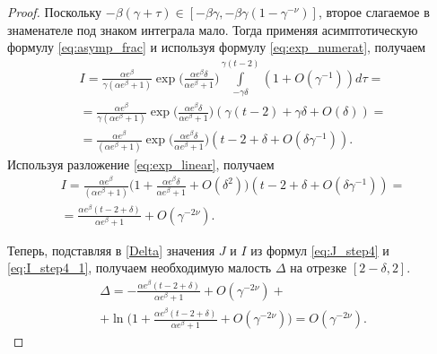 \begin{proof}
Поскольку $-\beta(\gamma + \tau) \in [-\beta\gamma, -\beta\gamma(1-\gamma^{-\nu})]$, второе слагаемое в знаменателе под знаком интеграла мало. Тогда применяя асимптотическую формулу \eqref{eq:asymp_frac} и используя формулу \eqref{eq:exp_numerat}, получаем
\begin{multline*}
	I=\frac{\alpha e^\beta}{\gamma(\alpha e^{\beta}+1)}\exp\Big(\frac{\alpha e^{\beta}\delta}{\alpha e^\beta+1}\Big)
	\int\limits_{-\gamma\delta}^{\gamma(t-2)}(1+O(\gamma^{-1}))d\tau
	=\\
	=\frac{\alpha e^\beta}{\gamma(\alpha e^{\beta}+1)}\exp\Big(\frac{\alpha e^{\beta}\delta}{\alpha e^\beta+1}\Big)(\gamma(t - 2) + \gamma\delta + O(\delta))
	=\\
	=\frac{\alpha e^\beta}{(\alpha e^{\beta}+1)}\exp\Big(\frac{\alpha e^{\beta}\delta}{\alpha e^\beta+1}\Big)(t-2+\delta+O(\delta\gamma^{-1})).
\end{multline*}
Используя разложение \eqref{eq:exp_linear}, получаем
\begin{multline}
	\label{eq:I_step4_1}
	I = \frac{\alpha e^\beta}{(\alpha e^{\beta} + 1)}\Big(1 + \frac{\alpha e^{\beta}\delta}{\alpha e^\beta+1} + O(\delta^2)\Big)(t-2+\delta+O(\delta\gamma^{-1})) = \\
	= \frac{\alpha e^\beta(t-2+\delta)}{\alpha e^\beta+1}+O(\gamma^{-2\nu}).
\end{multline}

Теперь, подставляя в \eqref{Delta} значения $J$ и $I$ из формул \eqref{eq:J_step4} и \eqref{eq:I_step4_1}, получаем необходимую малость $\Delta$ на отрезке $[2 - \delta, 2]$.
%
\begin{multline}
	\label{Delta_step4}
	\Delta=-\frac{\alpha e^\beta(t-2+\delta)}{\alpha e^\beta+1}+O(\gamma^{-2\nu}) + \\
	+ \ln\Big(1+\frac{\alpha e^\beta(t-2+\delta)}{\alpha e^\beta+1}+O(\gamma^{-2\nu})\Big)=O(\gamma^{-2\nu}).
\end{multline}



\end{proof}

